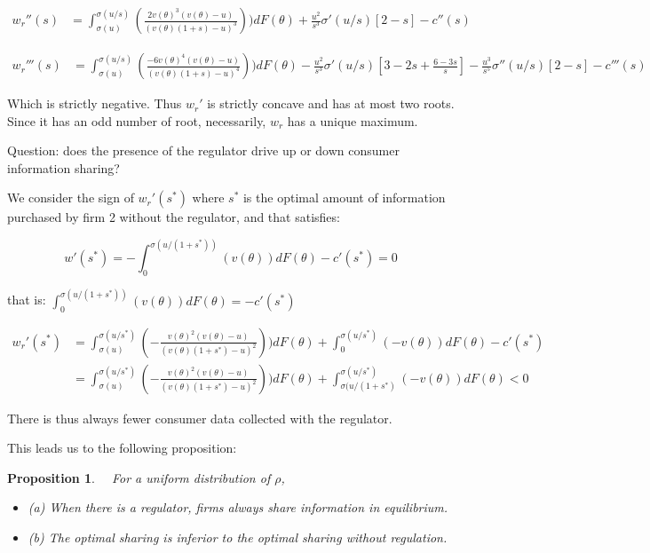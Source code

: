 \documentclass[a4paper,leqno]{article}%
\newtheorem{prop}{Proposition}
\renewcommand{\t}{\theta}
\newcommand{\s}{\sigma}
\begin{document}
\medskip

\begin{equation}
    \begin{aligned}
w_r''(s)&=\int_{\s(u)}^{\s(u/s)}(\frac{2v(\t)^3(v(\t)-u)}{(v(\t)(1+s)-u)^3}))dF(\t)+\frac{u^2}{s^3}\s'(u/s)[2-s]-c''(s)
\end{aligned}
\end{equation}


\medskip

\begin{equation}
    \begin{aligned}
w_r'''(s)&=\int_{\s(u)}^{\s(u/s)}(\frac{-6v(\t)^4(v(\t)-u)}{(v(\t)(1+s)-u)^4}))dF(\t)-\frac{u^2}{s^3}\s'(u/s)[3-2s+\frac{6-3s}{s}]-\frac{u^3}{s^5}\s''(u/s)[2-s]-c'''(s)
\end{aligned}
\end{equation}

Which is strictly negative. Thus $w_r'$ is strictly concave and has at most two roots. Since it has an odd number of root, necessarily, $w_r$ has a unique maximum. 

\medskip

Question: does the presence of the regulator drive up or down consumer information sharing?

\medskip

We consider the sign of $w_r'(s^*)$ where $s^*$ is the optimal amount of information purchased by firm 2 without the regulator, and that satisfies:


\[
w'(s^*)=-\int_{0}^{\s(u/(1+s^*))}(v(\t))dF(\t)-c'(s^*)=0
\]

that is: $\int_{0}^{\s(u/(1+s^*))}(v(\t))dF(\t)=-c'(s^*)$

\begin{equation}
    \begin{aligned}
w_r'(s^*)&=\int_{\s(u)}^{\s(u/s^*)}(-\frac{v(\t)^2(v(\t)-u)}{(v(\t)(1+s^*)-u)^2}))dF(\t)+\int_{0}^{\s(u/s^*)}(-v(\t))dF(\t)-c'(s^*)\\
    &=\int_{\s(u)}^{\s(u/s^*)}(-\frac{v(\t)^2(v(\t)-u)}{(v(\t)(1+s^*)-u)^2}))dF(\t)+\int_{\s(u/(1+s^*)}^{\s(u/s^*)}(-v(\t))dF(\t)<0
\end{aligned}
\end{equation}

There is thus always fewer consumer data collected with the regulator.

\medskip 

This leads us to the following proposition:

\begin{prop}~~\label{prop:2}
For a uniform distribution of $\rho$,
\begin{itemize}
    \item (a) When there is a regulator, firms always share information in equilibrium.
    \item (b) The optimal sharing is inferior to the optimal sharing without regulation.
\end{itemize} 
\end{prop}
\end{document}
